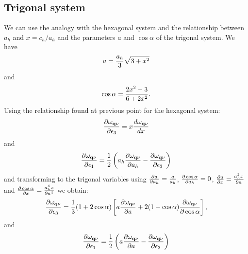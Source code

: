 \documentclass[12pt,a4paper]{article}
\begin{document}
\subsection{\color{web-blue}Trigonal system}
We can use the analogy with the hexagonal system and the relationship
between $a_h$ and $x=c_h/a_h$ and the parameters $a$ and $\cos \alpha$ of the
trigonal system. 
We have
\begin{equation}
a={a_h \over 3} \sqrt{3 + x^2}
\end{equation}
and
\begin{equation}
\cos\alpha={ 2 x^2 - 3 \over 6 + 2 x^2}.
\end{equation}
Using the relationship found at previous point for the hexagonal system:
\begin{equation}
{\partial \omega_{{\bf q}\nu} 
\over \partial \epsilon_3} = x {d \omega_{{\bf q}\nu} 
\over d x}
\end{equation}
and
\begin{equation}
{\partial \omega_{{\bf q}\nu} 
\over \partial \epsilon_1} = 
{1\over 2} \left(a_h {\partial \omega_{{\bf q}\nu} \over \partial a_h} - 
{\partial \omega_{{\bf q}\nu} \over \partial 
\epsilon_3} \right)
\end{equation}
and transforming to the trigonal variables using ${\partial a \over \partial
a_h}={a\over a_h}$, ${\partial \cos \alpha \over \partial
a_h}=0$, ${\partial a \over \partial x}={a_h^2 x \over 9 a}$ and
${\partial \cos \alpha \over \partial
x}={ a_h^4 x \over 9 a^4}$ we obtain:
\begin{equation}
{\partial \omega_{{\bf q}\nu} 
\over \partial \epsilon_3} = {1\over 3} (1 + 2 \cos \alpha)
\left[ a {\partial \omega_{{\bf q}\nu} \over \partial a} +
2 (1-\cos\alpha) {\partial \omega_{{\bf q}\nu} \over \partial \cos \alpha}
\right],
\end{equation}
and
\begin{equation}
{\partial \omega_{{\bf q}\nu} \over \partial \epsilon_1} = 
{1\over 2} \left(a {\partial \omega_{{\bf q}\nu} \over \partial a} - {\partial 
\omega_{{\bf q}\nu} \over \partial 
\epsilon_3} \right) 
\end{equation}
\end{document}
